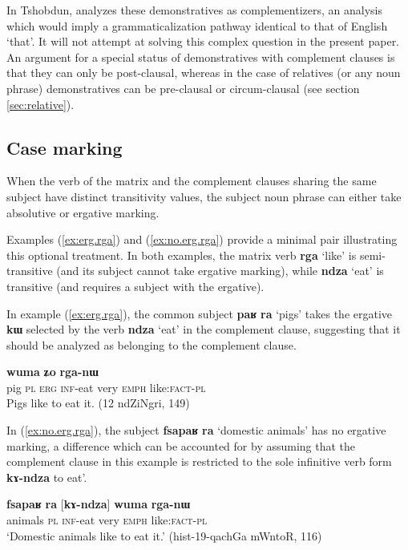 \documentclass[oneside,a4paper,11pt]{article}
\newcommand{\ipa}[1]{\textbf{\phon#1}} %
\newcommand{\jpg}[2]{\ipa{#1} `#2'} %
\begin{document}
In Tshobdun, \citet[481]{sun12complementation} analyzes these demonstratives as complementizers, an analysis which would imply a grammaticalization pathway identical to that of English `that'. It will not attempt  at solving this complex question in the present paper. An argument for a special status of demonstratives with complement clauses is that they can only be post-clausal, whereas in the case of relatives (or any noun phrase) demonstratives can be pre-clausal or circum-clausal (see section \ref{sec:relative}).

\subsection{Case marking}
When the verb of the matrix and the complement clauses sharing the same subject have distinct transitivity values, the subject noun phrase can either take absolutive or ergative marking. 

Examples (\ref{ex:erg.rga}) and (\ref{ex:no.erg.rga}) provide a minimal pair illustrating this optional treatment. In both examples, the matrix verb \jpg{rga}{like} is semi-transitive (and its subject cannot take ergative marking), while \jpg{ndza}{eat} is transitive (and requires a subject with the ergative).

In example (\ref{ex:erg.rga}), the common subject \ipa{paʁ} \ipa{ra}  `pigs' takes the ergative \ipa{kɯ} selected by the verb  \jpg{ndza}{eat} in the complement clause, suggesting that it should be analyzed as belonging to the complement clause.

\begin{exe}
\ex \label{ex:erg.rga}
\gll
[\ipa{paʁ}  	\ipa{ra}  	\ipa{kɯ}  	\ipa{kɤ-ndza}]  	\ipa{wuma}  	\ipa{ʑo}  	\ipa{rga-nɯ}  \\
pig \textsc{pl} \textsc{erg} \textsc{inf}-eat very \textsc{emph}  like:\textsc{fact}-\textsc{pl} \\
 \glt Pigs like to eat it. (12 ndZiNgri, 149)
\end{exe}

In (\ref{ex:no.erg.rga}), the subject \ipa{fsapaʁ} 	\ipa{ra} `domestic animals' has no ergative marking, a difference which can be accounted for by assuming that the  complement clause in this example is restricted to the sole infinitive verb form \ipa{kɤ-ndza}   to eat'.

\begin{exe}
\ex \label{ex:no.erg.rga}
\gll \ipa{fsapaʁ} 	\ipa{ra} 	[\ipa{kɤ-ndza}] 	\ipa{wuma} 	\ipa{rga-nɯ}  \\
animals \textsc{pl}  \textsc{inf}-eat very \textsc{emph}  like:\textsc{fact}-\textsc{pl} \\
\glt `Domestic animals like to eat it.' (hist-19-qachGa mWntoR, 116)
\end{exe}
 
\end{document}

